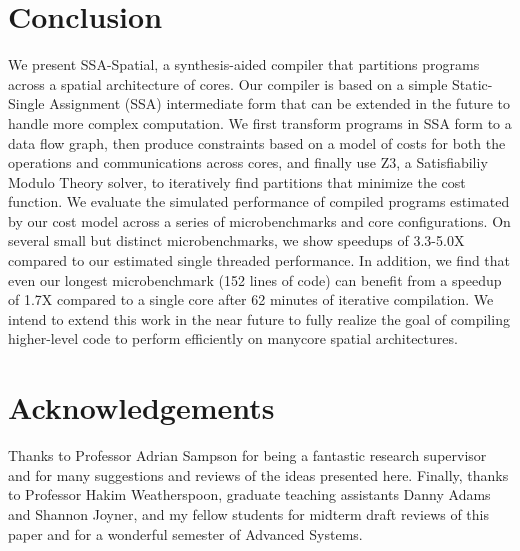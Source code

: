 \documentclass{sig-alternate-05-2015}
\begin{document}
\section{Conclusion}
We present SSA-Spatial, a synthesis-aided compiler that partitions programs across a spatial architecture of cores. Our compiler is based on a simple Static-Single Assignment (SSA) intermediate form that can be extended in the future to handle more complex computation. We first transform programs in SSA form to a data flow graph, then produce constraints based on a model of costs for both the operations and communications across cores, and finally use Z3, a Satisfiabiliy Modulo Theory solver, to iteratively find partitions that minimize the cost function. We evaluate the simulated performance of compiled programs estimated by our cost model across a series of microbenchmarks and core configurations. On several small but distinct microbenchmarks, we show speedups of 3.3-5.0X compared to our estimated single threaded performance. In addition, we find that even our longest microbenchmark (152 lines of code) can benefit from a speedup of 1.7X compared to a single core after 62 minutes of iterative compilation. We intend to extend this work in the near future to fully realize the goal of compiling higher-level code to perform efficiently on manycore spatial architectures. 

\section{Acknowledgements} 
Thanks to Professor Adrian Sampson for being a fantastic research supervisor and for many suggestions and reviews of the ideas presented here. Finally, thanks to Professor Hakim Weatherspoon, graduate teaching assistants Danny Adams and Shannon Joyner, and my fellow students for midterm draft reviews of this paper and for a wonderful semester of Advanced Systems. 

 
\end{document}
